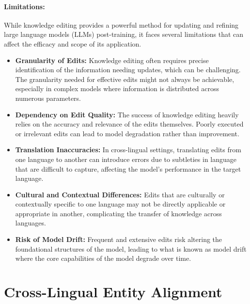 \paragraph{Limitations:} While knowledge editing provides a powerful method for updating and refining large language models (LLMs) post-training, it faces several limitations that can affect the efficacy and scope of its application. 
\begin{itemize}
	\item \textbf{Granularity of Edits:} Knowledge editing often requires precise identification of the information needing updates, which can be challenging. The granularity needed for effective edits might not always be achievable, especially in complex models where information is distributed across numerous parameters.
	\item \textbf{Dependency on Edit Quality:} The success of knowledge editing heavily relies on the accuracy and relevance of the edits themselves. Poorly executed or irrelevant edits can lead to model degradation rather than improvement.
	\item \textbf{Translation Inaccuracies:} In cross-lingual settings, translating edits from one language to another can introduce errors due to subtleties in language that are difficult to capture, affecting the model's performance in the target language.
	\item \textbf{Cultural and Contextual Differences:} Edits that are culturally or contextually specific to one language may not be directly applicable or appropriate in another, complicating the transfer of knowledge across languages.
	\item \textbf{Risk of Model Drift:} Frequent and extensive edits risk altering the foundational structures of the model, leading to what is known as model drift where the core capabilities of the model degrade over time.
\end{itemize}

\section{Cross-Lingual Entity Alignment}
